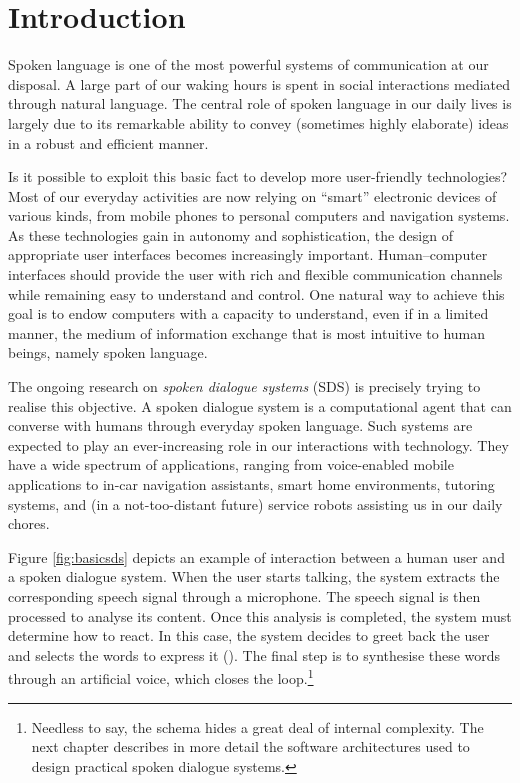
\chapter{Introduction}
\setcounter{page}{1}
\pagestyle{plain}

Spoken language is one of the most powerful systems of communication at our disposal. A large part of our waking hours is spent in social interactions mediated through natural language.  The central role of spoken language in our daily lives is largely due to its remarkable ability to convey (sometimes highly elaborate) ideas in a robust and efficient manner. 

Is it possible to exploit this basic fact to develop more user-friendly technologies? Most of our everyday activities are now relying on ``smart'' electronic devices of various kinds, from mobile phones to personal computers and navigation systems. As these technologies gain in autonomy and sophistication, the design of appropriate user interfaces becomes increasingly important. Human--computer interfaces should provide the user with rich and flexible communication channels while remaining easy to understand and control. One natural way to achieve this goal is to endow computers with a capacity to understand, even if in a limited manner, the medium of information exchange that is most intuitive to human beings, namely spoken language.  

The ongoing research on \textit{spoken dialogue systems} (SDS) is precisely trying to realise this objective. A spoken dialogue system is a computational agent that can converse with humans through everyday spoken language. Such systems are expected to play an ever-increasing role in our interactions with technology. They have a wide spectrum of applications, ranging from voice-enabled mobile applications to in-car navigation assistants, smart home environments, tutoring systems, and (in a not-too-distant future) service robots assisting us in our daily chores.

Figure \ref{fig:basicsds} depicts an example of interaction between a human user and a spoken dialogue system. When the user starts talking, the system extracts the corresponding speech signal through a microphone.  The speech signal is then processed to analyse its content.  Once this analysis is completed, the system must determine how to react.  In this case, the system decides to greet back the user and selects the words to express it (). The final step is to synthesise these words through an artificial voice, which closes the loop.\footnote{ Needless to say, the schema hides a great deal of internal complexity.  The next chapter describes in more detail the software architectures used to design practical spoken dialogue systems.}

